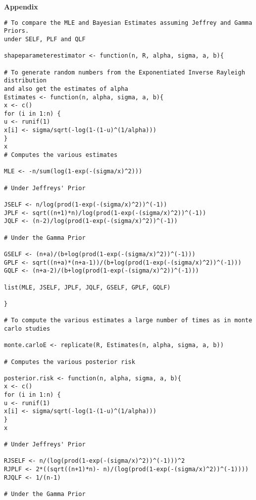 \documentclass[a4paper,12pt]{report}
\begin{document}
{


\nocite{Afaq2014}
\nocite{mudasir2016bayesian}
\nocite{yahgmaei2013bayesian}
\nocite{guure2012bayesian}
\nocite{metroplis}
\nocite{chen}

\newpage
{}
\begin{center}
	\Huge	\textbf{Appendix}
\end{center}
\appendix
\small
\begin{verbatim}
# To compare the MLE and Bayesian Estimates assuming Jeffrey and Gamma Priors.
under SELF, PLF and QLF

shapeparameterestimator <- function(n, R, alpha, sigma, a, b){

# To generate random numbers from the Exponentiated Inverse Rayleigh distribution
and also get the estimates of alpha
Estimates <- function(n, alpha, sigma, a, b){
x <- c()
for (i in 1:n) {
u <- runif(1)
x[i] <- sigma/sqrt(-log(1-(1-u)^(1/alpha)))
}
x
# Computes the various estimates

MLE <- -n/sum(log(1-exp(-(sigma/x)^2)))

# Under Jeffreys' Prior

JSELF <- n/log(prod(1-exp(-(sigma/x)^2))^(-1))
JPLF <- sqrt((n+1)*n)/log(prod(1-exp(-(sigma/x)^2))^(-1))
JQLF <- (n-2)/log(prod(1-exp(-(sigma/x)^2))^(-1))

# Under the Gamma Prior

GSELF <- (n+a)/(b+log(prod(1-exp(-(sigma/x)^2))^(-1)))
GPLF <- sqrt((n+a)*(n+a-1))/(b+log(prod(1-exp(-(sigma/x)^2))^(-1)))
GQLF <- (n+a-2)/(b+log(prod(1-exp(-(sigma/x)^2))^(-1)))

list(MLE, JSELF, JPLF, JQLF, GSELF, GPLF, GQLF)

}

# To compute the various estimates a large number of times as in monte carlo studies

monte.carloE <- replicate(R, Estimates(n, alpha, sigma, a, b))

# Computes the various posterior risk

posterior.risk <- function(n, alpha, sigma, a, b){
x <- c()
for (i in 1:n) {
u <- runif(1)
x[i] <- sigma/sqrt(-log(1-(1-u)^(1/alpha)))
}
x

# Under Jeffreys' Prior

RJSELF <- n/(log(prod(1-exp(-(sigma/x)^2))^(-1)))^2
RJPLF <- 2*((sqrt((n+1)*n)- n)/(log(prod(1-exp(-(sigma/x)^2))^(-1))))
RJQLF <- 1/(n-1)

# Under the Gamma Prior


\end{verbatim}}
\end{document}
